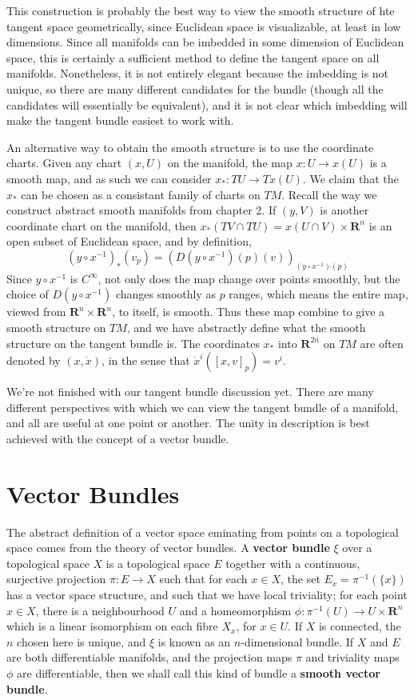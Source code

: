 This construction is probably the best way to view the smooth structure of hte tangent space geometrically, since Euclidean space is visualizable, at least in low dimensions. Since all manifolds can be imbedded in some dimension of Euclidean space, this is certainly a sufficient method to define the tangent space on all manifolds. Nonetheless, it is not entirely elegant because the imbedding is not unique, so there are many different candidates for the bundle (though all the candidates will essentially be equivalent), and it is not clear which imbedding will make the tangent bundle easiest to work with.

An alternative way to obtain the smooth structure is to use the coordinate charts. Given any chart $(x,U)$ on the manifold, the map $x: U \to x(U)$ is a smooth map, and as such we can consider $x_*: TU \to Tx(U)$. We claim that the $x_*$ can be chosen as a consistant family of charts on $TM$. Recall the way we construct abstract smooth manifolds from chapter 2. If $(y,V)$ is another coordinate chart on the manifold, then $x_*(TV \cap TU) = x(U \cap V) \times \mathbf{R}^n$ is an open subset of Euclidean space, and by definition,
%
\[ (y \circ x^{-1})_*(v_p) = (D(y \circ x^{-1})(p)(v))_{(y \circ x^{-1})(p)} \]
%
Since $y \circ x^{-1}$ is $C^\infty$, not only does the map change over points smoothly, but the choice of $D(y \circ x^{-1})$ changes smoothly as $p$ ranges, which means the entire map, viewed from $\mathbf{R}^n \times \mathbf{R}^n$, to itself, is smooth. Thus these map combine to give a smooth structure on $TM$, and we have abstractly define what the smooth structure on the tangent bundle is. The coordinates $x_*$ into $\mathbf{R}^{2n}$ on $TM$ are often denoted by $(x,\dot{x})$, in the sense that $\dot{x}^i([x,v]_p) = v^i$.

We're not finished with our tangent bundle discussion yet. There are many different perspectives with which we can view the tangent bundle of a manifold, and all are useful at one point or another. The unity in description is best achieved with the concept of a vector bundle.

\section{Vector Bundles}

The abstract definition of a vector space eminating from points on a topological space comes from the theory of vector bundles. A {\bf vector bundle} $\xi$ over a topological space $X$ is a topological space $E$ together with a continuous, surjective projection $\pi: E \to X$ such that for each $x \in X$, the set $E_x = \pi^{-1}(\{x\})$ has a vector space structure, and such that we have local triviality; for each point $x \in X$, there is a neighbourhood $U$ and a homeomorphism $\phi: \pi^{-1}(U) \to U \times \mathbf{R}^n$ which is a linear isomorphism on each fibre $X_x$, for $x \in U$. If $X$ is connected, the $n$ chosen here is unique, and $\xi$ is known as an $n$-dimensional bundle. If $X$ and $E$ are both differentiable manifolds, and the projection maps $\pi$ and triviality maps $\phi$ are differentiable, then we shall call this kind of bundle a {\bf smooth vector bundle}.

